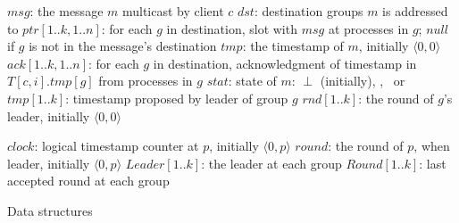 
\begin{algorithm}
\footnotesize

\begin{distribalgo}[1]

\vspace{1.0mm}
	\STATE $msg$: the message $m$ multicast by client $c$
	\STATE $dst$: destination groups $m$ is addressed to
	\STATE $ptr[1..k,1..n]$: for each $g$ in destination, slot with $msg$ at processes in $g$; $null$ if $g$ is not in the message's destination
	\STATE $tmp$: the timestamp of $m$, initially $\langle 0,0 \rangle$
	\STATE $ack[1..k,1..n]$: for each $g$ in destination, acknowledgment of timestamp in $T[c,i].tmp[g]$ from processes in $g$
	\STATE $stat$: state of $m$: $\perp$ (initially), \mcast, \ordered\ or \done
\ENDINDENT
\vspace{1.0mm}
	\STATE $tmp[1..k]$: timestamp proposed by leader of group $g$
	\STATE $rnd[1..k]$: the round of $g$'s leader, initially $\langle 0,0 \rangle$
\ENDINDENT
\vspace{1.0mm}
\vspace{1.0mm}

	\STATE $clock$: logical timestamp counter at $p$, initially $\langle 0,p \rangle$
	\STATE $round$: the round of $p$, when leader, initially $\langle 0,p \rangle$
	\STATE $Leader[1..k]$: the leader at each group
	\STATE $Round[1..k]$: last accepted round at each group
\ENDINDENT

\vspace{2.0mm}

%


\caption{Data structures}
\label{alg:data_struct}
\end{distribalgo}
\end{algorithm}

